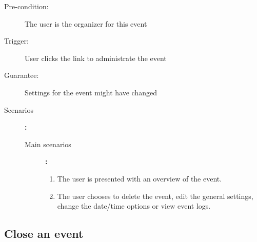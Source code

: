 \begin{description}
	\item[Pre-condition:] The user is the organizer for this event
	\item[Trigger:] User clicks the link to administrate the event
	\item[Guarantee:] Settings for the event might have changed
	\item[Scenarios]\textbf{:}\\
				\begin{description}
					\item[Main scenarios]\textbf{:}\\
								\begin{enumerate}
									\item The user is presented with an overview of the event.
									\item The user chooses to delete the event, edit the general settings, change the date/time options or view event logs.
								\end{enumerate}
				\end{description}
\end{description}
\pagebreak
\subsection{Close an event}


